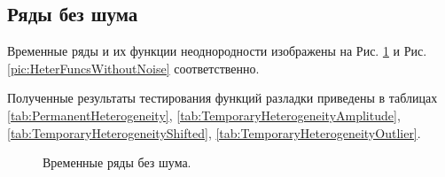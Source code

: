 \documentclass[specialist, substylefile = spbu.rtx,
			   subf, href, 12pt]{disser}
\begin{document}
\newpage

\subsection{Ряды без шума}

Временные ряды и их функции неоднородности изображены на Рис. \ref{pic:TimeSeriesWithoutNoise} и Рис. \ref{pic:HeterFuncsWithoutNoise} соответственно.


Полученные результаты тестирования функций разладки приведены в таблицах \ref{tab:PermanentHeterogeneity}, \ref{tab:TemporaryHeterogeneityAmplitude}, \ref{tab:TemporaryHeterogeneityShifted}, \ref{tab:TemporaryHeterogeneityOutlier}.

\newpage
\begin{figure}[!hhh]
	\caption{Временные ряды без шума.}
	\label{pic:TimeSeriesWithoutNoise}
\end{figure}
\end{document}
